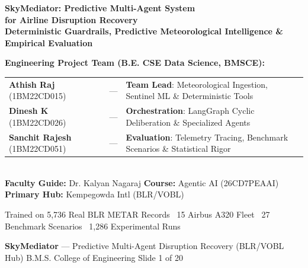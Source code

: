 \documentclass[11pt]{article}
\newcommand{\slidefooter}[1]{%
  \vfill
  \noindent{\color{BorderGray}\hrule height 0.8pt}\vspace{0.04in}
  \noindent\begin{minipage}{\textwidth}
    {\footnotesize\color{SlateGray}\textbf{SkyMediator} --- Predictive Multi-Agent Disruption Recovery (BLR/VOBL Hub) \hfill B.M.S. College of Engineering \hfill Slide #1 of 20}
  \end{minipage}
}
\begin{document}
\noindent\begin{minipage}[t][5.35in][t]{\textwidth}
\centering
\vspace{0.30in}
{\Huge\textbf{\color{NavyBlue}SkyMediator: Predictive Multi-Agent System}}\\[0.25em]
{\LARGE\textbf{\color{SkyBlue}for Airline Disruption Recovery}}\\[0.5em]
{\large\color{SlateGray}\textbf{Deterministic Guardrails, Predictive Meteorological Intelligence \& Empirical Evaluation}}\\[1.1em]

\begin{minipage}{0.92\textwidth}
\colorbox{CardBg}{%
\parbox{\linewidth}{%
\vspace{0.08in}
\centering
\textbf{\large Engineering Project Team (B.E. CSE Data Science, BMSCE):}\\[0.3em]
\begin{tabular}{lll}
\textbf{Athish Raj} (1BM22CD015) & --- & \textbf{Team Lead}: Meteorological Ingestion, Sentinel ML \& Deterministic Tools \\
\textbf{Dinesh K} (1BM22CD026) & --- & \textbf{Orchestration}: LangGraph Cyclic Deliberation \& Specialized Agents \\
\textbf{Sanchit Rajesh} (1BM22CD051) & --- & \textbf{Evaluation}: Telemetry Tracing, Benchmark Scenarios \& Statistical Rigor \\
\end{tabular}\\[0.4em]
\textbf{Faculty Guide:} Dr. Kalyan Nagaraj \quad\textbar\quad \textbf{Course:} Agentic AI (26CD7PEAAI) \quad\textbar\quad \textbf{Primary Hub:} Kempegowda Intl (BLR/VOBL)
\vspace{0.06in}
}%
}
\end{minipage}
\vfill
{\footnotesize\color{SlateGray}Trained on 5,736 Real BLR METAR Records \textbar\ 15 Airbus A320 Fleet \textbar\ 27 Benchmark Scenarios \textbar\ 1,286 Experimental Runs}
\slidefooter{1}
\end{minipage}
\clearpage
\end{document}
